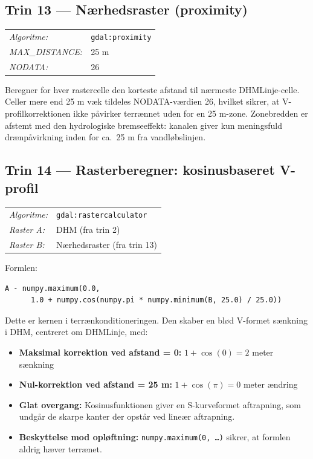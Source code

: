 \subsection{Trin 13 — Nærhedsraster (proximity)}

\begin{tabular}{ll}
  \textit{Algoritme:}     & \texttt{gdal:proximity} \\
  \textit{MAX\_DISTANCE:} & 25 m \\
  \textit{NODATA:}        & 26 \\
\end{tabular}

\medskip
Beregner for hver rastercelle den korteste afstand til nærmeste DHMLinje-celle.
Celler mere end 25 m væk tildeles NODATA-værdien 26, hvilket sikrer, at
V-profilkorrektionen ikke påvirker terrænnet uden for en 25 m-zone.
Zonebredden er afstemt med den hydrologiske bremseeffekt: kanalen giver kun
meningsfuld drænpåvirkning inden for ca.\ 25 m fra vandløbslinjen.

\subsection{Trin 14 — Rasterberegner: kosinusbaseret V-profil}

\begin{tabular}{ll}
  \textit{Algoritme:} & \texttt{gdal:rastercalculator} \\
  \textit{Raster A:}  & DHM (fra trin 2) \\
  \textit{Raster B:}  & Nærhedsraster (fra trin 13) \\
\end{tabular}

\medskip
Formlen:
\begin{verbatim}
A - numpy.maximum(0.0,
      1.0 + numpy.cos(numpy.pi * numpy.minimum(B, 25.0) / 25.0))
\end{verbatim}

Dette er kernen i terrænkonditioneringen. Den skaber en blød V-formet
sænkning i DHM, centreret om DHMLinje, med:

\begin{itemize}
  \item \textbf{Maksimal korrektion ved afstand = 0:}
        $1 + \cos(0) = 2$ meter sænkning
  \item \textbf{Nul-korrektion ved afstand = 25 m:}
        $1 + \cos(\pi) = 0$ meter ændring
  \item \textbf{Glat overgang:} Kosinusfunktionen giver en S-kurveformet
        aftrapning, som undgår de skarpe kanter der opstår ved lineær aftrapning.
  \item \textbf{Beskyttelse mod opløftning:}
        \texttt{numpy.maximum(0, \ldots)} sikrer, at formlen aldrig hæver terrænet.
\end{itemize}

